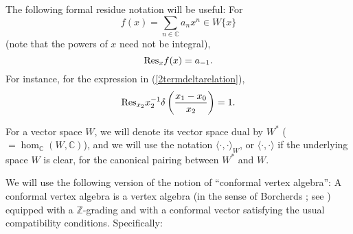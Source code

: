\documentclass[12pt]{article}
\begin{document}
The following formal residue notation will be useful: For
\[
f(x) = \sum_{n\in \mathbb{C}}a_{n}x^{n} \in W\{x\}
\]
(note that the powers of $x$ need not be integral),
\[
{\mbox{\rm Res}_x}f(x) = a_{-1}.
\]
For instance, for the expression in (\ref{2termdeltarelation}),
\begin{equation}
\mbox{\rm Res}_{x_2}x_{2}^{-1}\delta\left(\frac{x_{1}-x_{0}}{x_{2}}\right)=1.
\end{equation}

For a vector space $W$, we will denote its vector space dual by $W^*$
($=\hom_{\mathbb C}(W,{\mathbb C})$), and we will use the notation
$\langle\cdot,\cdot\rangle_W$, or $\langle\cdot,\cdot\rangle$ if the
underlying space $W$ is clear, for the canonical pairing between $W^*$
and $W$.

We will use the following version of the notion of ``conformal vertex
algebra'': A conformal vertex algebra is a vertex algebra (in the
sense of Borcherds \cite{B}; see \cite{LL}) equipped with a ${\mathbb
Z}$-grading and with a conformal vector satisfying the usual
compatibility conditions.  Specifically:
\end{document}
